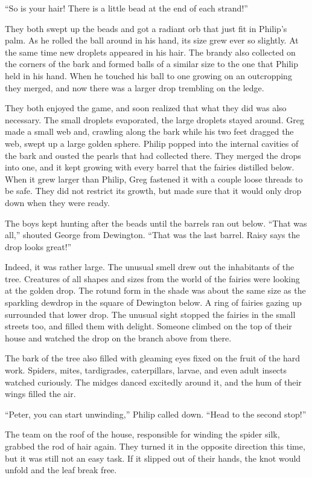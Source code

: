 \documentclass[10pt, draft]{memoir}
\begin{document}
``So is your hair! There is a little bead at the end of each strand!''

They both swept up the beads and got a radiant orb that just fit in Philip's palm. As he rolled the ball around in his hand, its size grew ever so slightly. At the same time new droplets appeared in his hair. The brandy also collected on the corners of the bark and formed balls of a similar size to the one that Philip held in his hand. When he touched his ball to one growing on an outcropping they merged, and now there was a larger drop trembling on the ledge.

They both enjoyed the game, and soon realized that what they did was also necessary. The small droplets evaporated, the large droplets stayed around. Greg made a small web and, crawling along the bark while his two feet dragged the web, swept up a large golden sphere. Philip popped into the internal cavities of the bark and ousted the pearls that had collected there. They merged the drops into one, and it kept growing with every barrel that the fairies distilled below. When it grew larger than Philip, Greg fastened it with a couple loose threads to be safe. They did not restrict its growth, but made sure that it would only drop down when they were ready.

The boys kept hunting after the beads until the barrels ran out below. ``That was all,'' shouted George from Dewington. ``That was the last barrel. Raisy says the drop looks great!''

Indeed, it was rather large. The unusual smell drew out the inhabitants of the tree. Creatures of all shapes and sizes from the world of the fairies were looking at the golden drop. The rotund form in the shade was about the same size as the sparkling dewdrop in the square of Dewington below. A ring of fairies gazing up surrounded that lower drop. The unusual sight stopped the fairies in the small streets too, and filled them with delight. Someone climbed on the top of their house and watched the drop on the branch above from there.

The bark of the tree also filled with gleaming eyes fixed on the fruit of the hard work. Spiders, mites, tardigrades, caterpillars, larvae, and even adult insects watched curiously. The midges danced excitedly around it, and the hum of their wings filled the air.

``Peter, you can start unwinding,'' Philip called down. ``Head to the second stop!''

The team on the roof of the house, responsible for winding the spider silk, grabbed the rod of hair again. They turned it in the opposite direction this time, but it was still not an easy task. If it slipped out of their hands, the knot would unfold and the leaf break free.
\end{document}
